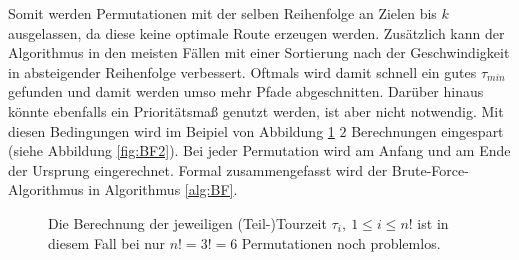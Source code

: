 \documentclass[german,version-2019-11]{uzl-thesis}
\begin{document}
Somit werden Permutationen mit der selben Reihenfolge an Zielen bis $k$ ausgelassen, da diese keine optimale Route erzeugen werden. Zusätzlich kann der Algorithmus in den meisten Fällen mit einer Sortierung nach der Geschwindigkeit in absteigender Reihenfolge verbessert. Oftmals wird damit schnell ein gutes $\tau_{min}$ gefunden und damit werden umso mehr Pfade abgeschnitten. Darüber hinaus könnte ebenfalls ein Prioritätsmaß genutzt werden, ist aber nicht notwendig.
Mit diesen Bedingungen wird im Beipiel von Abbildung \ref{fig:BF1} $2$ Berechnungen eingespart (siehe Abbildung \ref{fig:BF2}). Bei jeder Permutation wird am Anfang und am Ende der Ursprung eingerechnet. Formal zusammengefasst wird der Brute-Force-Algorithmus in Algorithmus \ref{alg:BF}.

\newpage

\begin{figure}[htbp]
\centering
{}
\caption{Die Berechnung der jeweiligen (Teil-)Tourzeit $\tau_{i}, ~1\leq i\leq n!$ ist in diesem Fall bei nur $n!=3!=6$ Permutationen noch problemlos.}
\label{fig:BF1}
\end{figure}
\end{document}
